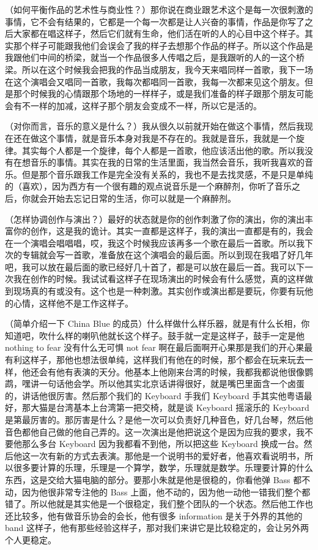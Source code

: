 \documentclass[UTF8,a4paper,oneside,twocolumn,12pt]{ctexbook}
\begin{document}
（如何平衡作品的艺术性与商业性？）那你说在商业跟艺术这个是每一次很刺激的事情，它不会有结果的，它都是一个每一次都是让人兴奋的事情，作品是你写了之后大家都在唱这样子，然后它们就有生命，他们活在听的人的心目中这个样子。其实那个样子可能跟我他们会误会了我的样子去想那个作品的样子。所以这个作品是我跟他们中间的桥梁，就当一个作品很多人传唱之后，是我跟听的人的一这个桥梁。所以在这个时候我会把我的作品当成朋友，我今天来唱同样一首歌，我下一场在这个演唱会又唱同一首歌，我每次都唱同一首歌，我每一次都来见这个朋友。但是那个时候我的心情跟那个场地的一样样子，或是我们准备的样子跟那个朋友可能会有不一样的加减，这样子那个朋友会变成不一样，所以它是活的。

（对你而言，音乐的意义是什么？）我从很久以前就开始在做这个事情，然后我现在还在做这个事情，就是音乐本身对我是不存在的。我就是音乐，我就是一个旋律。其实每个人都是一个旋律，每个人都是一首歌，他应该活出他的歌。所以我没有在想音乐的事情。其实在我的日常的生活里面，我当然会音乐，我听我喜欢的音乐。但是那个音乐跟我工作是完全没有关系的，我也不是去找灵感，不是只是单纯的（喜欢），因为西方有一个很有趣的观点说音乐是一个麻醉剂，你听了音乐之后，你就会开始去忘记日常的生活，你可以就是一个麻醉剂。

（怎样协调创作与演出？）最好的状态就是你的创作刺激了你的演出，你的演出丰富你的创作，这是我的诡计。其实一直都是这样子，我的演出一直都是有的，我会在一个演唱会唱唱唱，哎，我这个时候我应该再多一个歌在最后一首歌。所以我下次的专辑就会写一首歌，准备放在这个演唱会的最后面。所以到现在我唱了好几年吧，我可以放在最后面的歌已经好几十首了，都是可以放在最后一首。我可以下一次我在创作的时候。我试试看这样子在现场演出的时候会有什么感觉，真的这样做到现场真的有或没有。这个也是一种刺激。其实创作或演出都是要玩，你要有玩他的心情，这样他不是工作这样子。

（简单介绍一下 China Blue 的成员）什么样做什么样乐器，就是有什么长相，你知道吧，吹什么样的喇叭他就长这个样子。鼓手就一定是这样子，鼓手一定是他 nothing to fear 没有什么无可惧 not fear 啊在最后面啊开心果那是我们的开心果最有利这样子，那他也想法很单纯，这样我们有他在的时候，那个都会在玩来玩去一样，他还会有他有表演的天分。他基本上他刚来台湾的时候，我都我都说他很像鹦鹉，嘿讲一句话他会学。所以他其实北京话讲得很好，就是嘴巴里面含一个卤蛋的，讲话他很厉害。然后那个我们的 Keyboard 手我们 Keyboard 手其实他粤语最好，那大猫是台湾基本上台湾第一把交椅，就是谈 Keyboard 摇滚乐的 Keyboard 是第最厉害的。那厉害是什么？是他一次可以负责好几种音色，好几台琴，然后他音色都他自己做的他自己弄的。这一次演出是他把说这个是因为应我的要求，我不要他那么多台 Keyboard 因为我都看不到他，所以把这些 Keyboard 换成一台。然后他这一次有新的方式去表演。那他是一个说明书的爱好者，他喜欢看说明书，所以很多要计算的乐理，乐理是一个算学，数学，乐理就是数学。乐理要计算的什么东西，这是交给大猫电脑的部分。要那小朱就是他是很稳的，你看他弹 Bass 都不动，因为他很非常专注他的 Bass 上面，他不动的，因为他一动他一错我们整个都错了。所以他就是其实他是一个很稳定，我们整个团队的一个状态。然后他工作也还比较多，他有做音乐协会的会长，他有很多 information 是关于外界的其他的 band 这样子，他有那些经验这样子，那对我们来讲它是比较稳定的，会让另外两个人更稳定。
\end{document}
